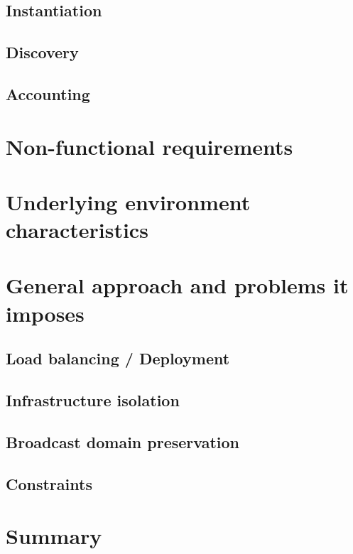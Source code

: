 \documentclass[11pt]{book}
\begin{document}
      \subsection{Instantiation}

      \subsection{Discovery}

      \subsection{Accounting}  %


    \section{Non-functional requirements}

    \section{Underlying environment characteristics}

    \section{General approach and problems it imposes}

      \subsection{Load balancing / Deployment}

      \subsection{Infrastructure isolation}

      \subsection{Broadcast domain preservation}

      \subsection{Constraints}


    \section*{Summary}
\end{document}
